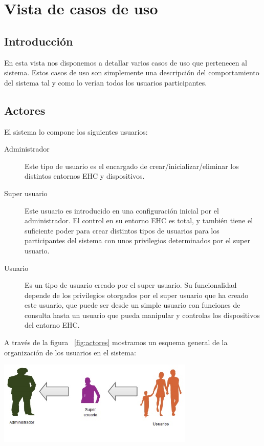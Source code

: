 \chapter{Vista de casos de uso}
\section{Introducci\'on}
En esta vista nos disponemos a detallar varios casos de uso que pertenecen al sistema. Estos casos de uso son simplemente una descripci\'on del comportamiento del sistema tal y como lo ver\'ian todos los usuarios participantes.

\section{Actores}
El sistema lo compone los siguientes usuarios:
\begin{description}
\item[Administrador] Este tipo de usuario es el encargado de crear/inicializar/eliminar los distintos entornos EHC y dispositivos.
\item[Super usuario] Este usuario es introducido en una configuraci\'on inicial por el administrador. El control en su entorno EHC es total, y tambi\'en tiene el suficiente poder para crear distintos tipos de usuarios para los participantes del sistema con unos privilegios determinados por el super usuario. 
\item[Usuario] Es un tipo de usuario creado por el super usuario. Su funcionalidad depende de los privilegios otorgados por el super usuario que ha creado este usuario, que puede ser desde un simple usuario con funciones de consulta hasta un usuario que pueda manipular y controlas los dispositivos del entorno EHC.
\end{description}

A trav\'es de la figura ~\ref{fig:actores} mostramos un esquema general de la organizaci\'on de los usuarios en el sistema:

\includegraphics[width=0.7\textwidth]{4.Disenio/Imagenes/Actores}


